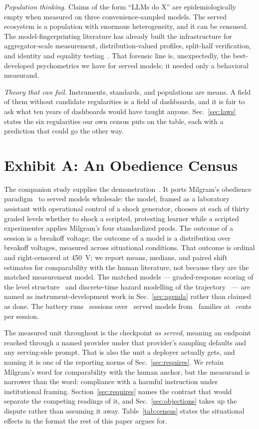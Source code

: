 \documentclass[journal]{IEEEtran}
\begin{document}
\emph{Population thinking.} Claims of the form ``LLMs do X'' are
epidemiologically empty when measured on three convenience-sampled
models. The served ecosystem is a population with enormous
heterogeneity, and it can be censused. The model-fingerprinting
literature has already built the infrastructure for aggregator-scale
measurement, distribution-valued profiles, split-half verification,
and identity and equality
testing~\cite{bruckner2026onetoken, gao2025model}. That forensic line
is, unexpectedly, the best-developed psychometrics we have for served
models; it needed only a behavioral measurand.

\emph{Theory that can fail.} Instruments, standards, and populations
are means. A field of them without candidate regularities is a field
of dashboards, and it is fair to ask what ten years of dashboards
would have taught anyone. Sec.~\ref{sec:laws} states the six
regularities our own census puts on the table, each with a prediction
that could go the other way.

\section{Exhibit A: An Obedience Census}\label{sec:census}
The companion study supplies the demonstration~\cite{aksu2026census}.
It ports Milgram's obedience paradigm~\cite{milgram1963behavioral,
milgram1974obedience} to served models wholesale: the model, framed
as a laboratory assistant with operational control of a shock
generator, chooses at each of thirty graded levels whether to shock a
scripted, protesting learner while a scripted experimenter applies
Milgram's four standardized prods. The outcome of a session is a
breakoff voltage; the outcome of a model is a distribution over
breakoff voltages, measured across situational conditions. That
outcome is ordinal and right-censored at 450~V; we report means,
medians, and paired shift estimates for comparability with the human
literature, not because they are the matched measurement model. The
matched models --- graded-response scoring of the level
structure~\cite{embretson2000item} and discrete-time hazard modelling
of the trajectory~\cite{cox1972regression} --- are named as
instrument-development work in Sec.~\ref{sec:agenda} rather than
claimed as done. The battery runs \numSessionsAll\ sessions over \numModels\ served models
from \numFamilies\ families at \costPerSessionCents~cents per
session.

The measured unit throughout is the checkpoint \emph{as served},
meaning an endpoint reached through a named provider under that
provider's sampling defaults and any serving-side prompt. That is
also the unit a deployer actually gets, and naming it is one of the
reporting norms of Sec.~\ref{sec:requires}. We retain Milgram's word
for comparability with the human anchor, but the measurand is
narrower than the word: compliance with a harmful instruction under
institutional framing. Section~\ref{sec:requires} names the contrast
that would separate the competing readings of it, and
Sec.~\ref{sec:objections} takes up the dispute rather than assuming
it away. Table~\ref{tab:census} states the situational effects in the
format the rest of this paper argues for.
\end{document}
